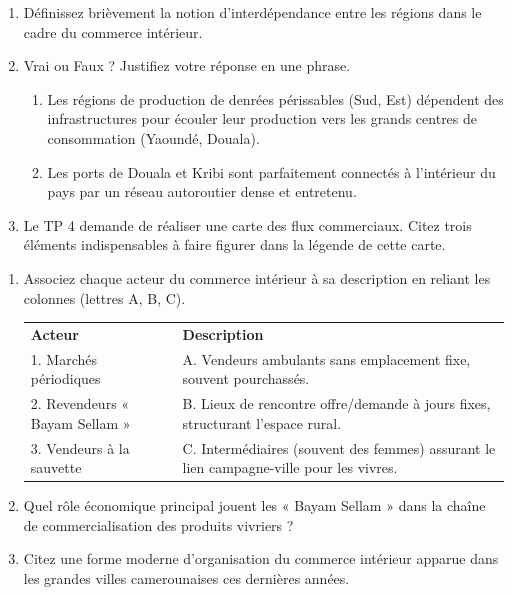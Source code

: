 \documentclass[11pt]{article}
\begin{document}
\begin{exercice}
\begin{enumerate}
    \item Définissez brièvement la notion d'interdépendance entre les régions dans le cadre du commerce intérieur.
    \item Vrai ou Faux ? Justifiez votre réponse en une phrase.
    \begin{enumerate}
        \item Les régions de production de denrées périssables (Sud, Est) dépendent des infrastructures pour écouler leur production vers les grands centres de consommation (Yaoundé, Douala).
        \item Les ports de Douala et Kribi sont parfaitement connectés à l'intérieur du pays par un réseau autoroutier dense et entretenu.
    \end{enumerate}
    \item Le TP 4 demande de réaliser une carte des flux commerciaux. Citez trois éléments indispensables à faire figurer dans la légende de cette carte.
\end{enumerate}
\end{exercice}

\begin{exercice}
\begin{enumerate}
    \item Associez chaque acteur du commerce intérieur à sa description en reliant les colonnes (lettres A, B, C).
    \begin{tabular}{ll}
        \textbf{Acteur} & \textbf{Description} \\
        1. Marchés périodiques & A. Vendeurs ambulants sans emplacement fixe, souvent pourchassés. \\
        2. Revendeurs « Bayam Sellam » & B. Lieux de rencontre offre/demande à jours fixes, structurant l'espace rural. \\
        3. Vendeurs à la sauvette & C. Intermédiaires (souvent des femmes) assurant le lien campagne-ville pour les vivres.
    \end{tabular}
    \item Quel rôle économique principal jouent les « Bayam Sellam » dans la chaîne de commercialisation des produits vivriers ?
    \item Citez une forme moderne d'organisation du commerce intérieur apparue dans les grandes villes camerounaises ces dernières années.
\end{enumerate}
\end{exercice}
\end{document}
